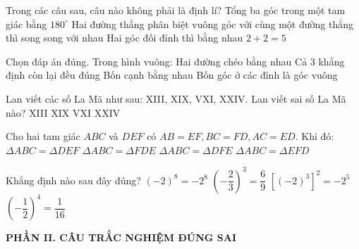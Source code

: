 \documentclass[12pt,a4paper]{article}
\begin{document}
\begin{ex}
Trong các câu sau, câu nào không phải là định lí?
\choice
{Tổng ba góc trong một tam giác bằng $180^\circ$}
{Hai đường thẳng phân biệt vuông góc với cùng một đường thẳng thì song song với nhau}
{Hai góc đối đỉnh thì bằng nhau}
{\True $2 + 2 = 5$}
\end{ex}

\begin{ex}
Chọn đáp án đúng. Trong hình vuông:
\choice
{Hai đường chéo bằng nhau}
{\True Cả 3 khẳng định còn lại đều đúng}
{Bốn cạnh bằng nhau}
{Bốn góc ở các đỉnh là góc vuông}
\end{ex}

\begin{ex}
Lan viết các số La Mã như sau: XIII, XIX, VXI, XXIV. Lan viết sai số La Mã nào?
\choice
{XIII}
{XIX}
{\True VXI}
{XXIV}
\end{ex}

\begin{ex}
Cho hai tam giác $ABC$ và $DEF$ có $AB = EF, BC = FD, AC = ED$. Khi đó:
\choice
{$\Delta ABC = \Delta DEF$}
{$\Delta ABC = \Delta FDE$}
{$\Delta ABC = \Delta DFE$}
{\True $\Delta ABC = \Delta EFD$}
\end{ex}

\begin{ex}
Khẳng định nào sau đây đúng?
\choice
{$(-2)^8 = -2^8$}
{$\left(-\dfrac{2}{3}\right)^3 = \dfrac{6}{9}$}
{$[(-2)^3]^2 = -2^5$}
{\True $\left(-\dfrac{1}{2}\right)^4 = \dfrac{1}{16}$}
\end{ex}


\setcounter{ex}{0}
\noindent\textbf{\large PHẦN II. CÂU TRẮC NGHIỆM ĐÚNG SAI}
\end{document}

